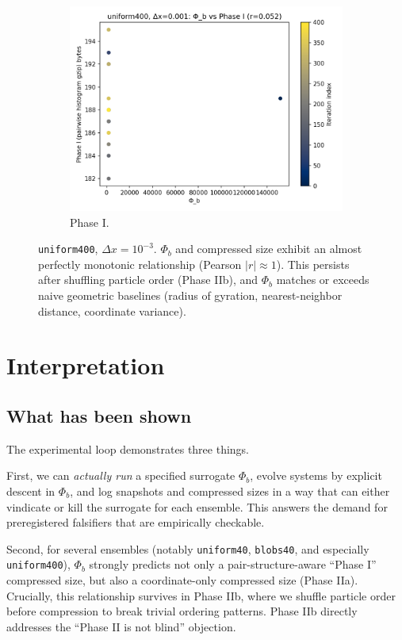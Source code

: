 \documentclass[11pt,a4paper]{article}
\numberwithin{equation}{section}
\newcommand{\phib}{\Phi_b}
\begin{document}
\begin{figure}[h!]
\begin{subfigure}[b]{0.32\textwidth}
\includegraphics[width=\textwidth]{figures/uniform400_dx0.001_phib_vs_phase1.png}
\caption{Phase I.}
\end{subfigure}
\caption{\texttt{uniform400}, $\Delta x{=}10^{-3}$. $\phib$ and compressed size exhibit an almost perfectly monotonic relationship (Pearson $|r|\approx 1$). This persists after shuffling particle order (Phase IIb), and $\phib$ matches or exceeds naive geometric baselines (radius of gyration, nearest-neighbor distance, coordinate variance).}
\label{fig:uniform400_corr}
\end{figure}

\clearpage

\section{Interpretation}
\subsection{What has been shown}
The experimental loop demonstrates three things.

First, we can \emph{actually run} a specified surrogate $\phib$, evolve systems by explicit descent in $\phib$, and log snapshots and compressed sizes in a way that can either vindicate or kill the surrogate for each ensemble. This answers the demand for preregistered falsifiers that are empirically checkable.

Second, for several ensembles (notably \texttt{uniform40}, \texttt{blobs40}, and especially \texttt{uniform400}), $\phib$ strongly predicts not only a pair-structure-aware ``Phase I'' compressed size, but also a coordinate-only compressed size (Phase IIa). Crucially, this relationship survives in Phase IIb, where we shuffle particle order before compression to break trivial ordering patterns. Phase IIb directly addresses the ``Phase II is not blind'' objection.
\end{document}
